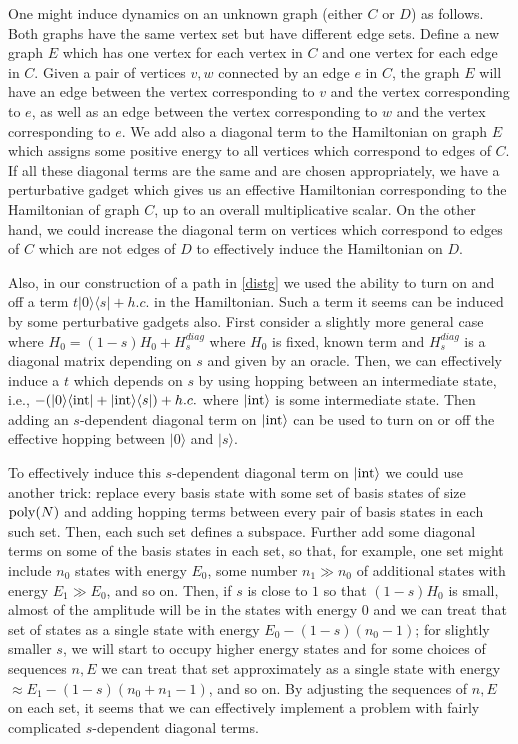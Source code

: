 \documentclass[letterpaper,onecolumn]{quantumarticle}
\begin{document}
One might induce dynamics on an unknown graph (either $C$ or $D$) as follows.
Both graphs have the same vertex set but have different edge sets.  Define a new graph $E$ which has one vertex for each vertex in $C$ and one vertex for each edge in $C$.  Given a pair of vertices $v,w$ connected by an edge $e$ in $C$, the graph $E$ will have
an edge between the vertex corresponding to $v$ and the vertex corresponding to $e$, as well as an edge between the
vertex corresponding to $w$ and the vertex corresponding to $e$.  We add also a diagonal term to the Hamiltonian on graph $E$ which assigns some positive energy to all vertices which correspond to edges of $C$.  If all these diagonal terms are the same and are chosen appropriately, we have a perturbative gadget which gives us an effective Hamiltonian corresponding to the Hamiltonian of graph $C$, up to an overall multiplicative scalar.  On the other hand, we could increase the diagonal term on vertices which correspond to edges of $C$ which are not edges of $D$ to effectively induce the Hamiltonian on $D$.

Also, in our construction of a path in \cref{distg} we used the ability to turn on and off a term $t|0\rangle\langle s| + h.c.$ in the Hamiltonian.  Such a term it seems can be induced by some perturbative gadgets also.  First  consider a slightly more general case where $H_0=(1-s) H_0 + H^{diag}_s$ where $H_0$ is fixed, known term and $H^{diag}_s$ is a diagonal matrix depending on $s$ and given by an oracle.  Then, we can effectively induce a $t$ which depends on $s$ by using hopping between an intermediate state, i.e., $-(|0\rangle\langle {\rm int}| + |{\rm int}\rangle\langle s|)+h.c.$ where $|{\rm int}\rangle$ is some intermediate state.  Then adding an $s$-dependent diagonal term on $|{\rm int}\rangle$ can be used to turn on or off the effective hopping between $|0\rangle$ and $|s\rangle$.

To effectively induce this $s$-dependent diagonal term on $|{\rm int}\rangle$ we could use another trick: replace every basis state with some set of basis states of size ${\rm poly}(N)$ and adding hopping terms between every pair of basis states in each such set. 
Then, each such set defines a subspace.
 Further add some diagonal terms on some of the basis states in each set, so that, for example, one set might include $n_0$ states with energy $E_0$, some number $n_1\gg n_0$ of additional states with energy $E_1\gg E_0$, and so on.  Then, if $s$ is close to $1$ so that $(1-s)H_0$ is small, almost of the amplitude will be in the states with energy $0$ and we can treat that set of states as a single state with energy $E_0-(1-s) (n_0-1)$; for slightly smaller $s$, we will start to occupy higher energy states and for some choices of sequences $n,E$ we can treat that set approximately as  a single state with energy
$\approx E_1-(1-s) (n_0+n_1-1)$, and so on. 
 By adjusting the sequences of $n,E$ on each set, it seems that we can 
 effectively implement a problem with fairly complicated $s$-dependent diagonal terms.



\end{document}
